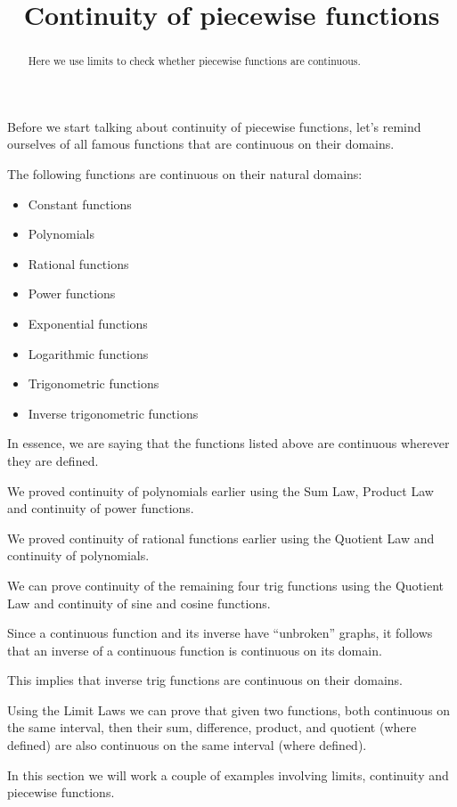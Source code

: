 \documentclass{ximera}
\title[Dig-In:]{Continuity of piecewise functions}
\begin{document}
\begin{abstract}
Here we use limits to check whether piecewise functions are continuous.
\end{abstract}
\maketitle
Before we start talking about continuity of piecewise functions, let's remind ourselves of all famous functions that are continuous on their domains.
\begin{theorem}\label{theorem:continuity}
The following functions are continuous on their natural domains:
\begin{itemize}
\item Constant functions 
\item Polynomials  
\item Rational functions  
\item Power functions 
\item Exponential functions  
\item Logarithmic functions  
\item Trigonometric functions  
\item Inverse trigonometric functions     
\end{itemize}
In essence, we are saying that the functions listed above are
continuous wherever they are defined.

We proved continuity of polynomials earlier using the Sum Law, Product
Law and continuity of power functions.


We proved continuity of rational functions earlier using the Quotient
Law and continuity of polynomials.


We can prove continuity of the remaining four trig functions using the
Quotient Law and continuity of sine and cosine functions.


Since a continuous function and its inverse have ``unbroken'' graphs,
it follows that an inverse of a continuous function is continuous on
its domain.


This implies that inverse trig functions are continuous on their domains. 


Using the Limit Laws we can prove that given two functions, both
continuous on the same interval, then their sum, difference, product,
and quotient (where defined) are also continuous on the same interval
(where defined).
\end{theorem}
In this section we will work a couple of examples involving limits,
continuity and piecewise functions.
\end{document}
